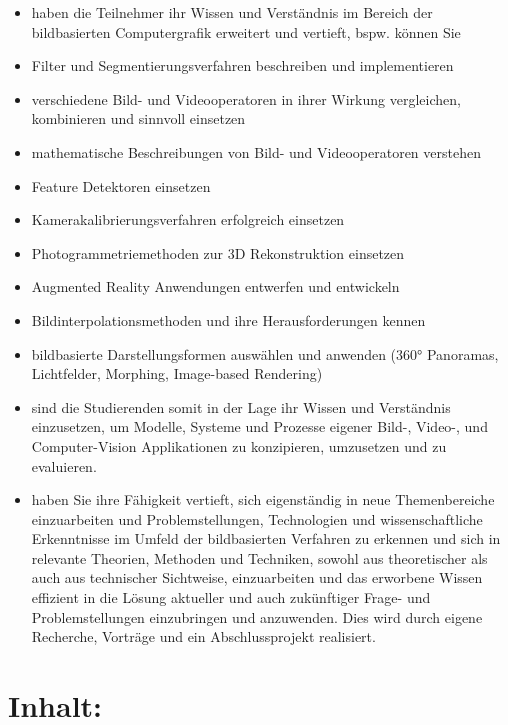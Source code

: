 \begin{itemize}
\tightlist
\item
  haben die Teilnehmer ihr Wissen und Verständnis im Bereich der
  bildbasierten Computergrafik erweitert und vertieft, bspw. können Sie
\item
  Filter und Segmentierungsverfahren beschreiben und implementieren
\item
  verschiedene Bild- und Videooperatoren in ihrer Wirkung vergleichen,
  kombinieren und sinnvoll einsetzen
\item
  mathematische Beschreibungen von Bild- und Videooperatoren verstehen
\item
  Feature Detektoren einsetzen
\item
  Kamerakalibrierungsverfahren erfolgreich einsetzen
\item
  Photogrammetriemethoden zur 3D Rekonstruktion einsetzen
\item
  Augmented Reality Anwendungen entwerfen und entwickeln
\item
  Bildinterpolationsmethoden und ihre Herausforderungen kennen
\item
  bildbasierte Darstellungsformen auswählen und anwenden (360°
  Panoramas, Lichtfelder, Morphing, Image-based Rendering)
\item
  sind die Studierenden somit in der Lage ihr Wissen und Verständnis
  einzusetzen, um Modelle, Systeme und Prozesse eigener Bild-, Video-,
  und Computer-Vision Applikationen zu konzipieren, umzusetzen und zu
  evaluieren.
\item
  haben Sie ihre Fähigkeit vertieft, sich eigenständig in neue
  Themenbereiche einzuarbeiten und Problemstellungen, Technologien und
  wissenschaftliche Erkenntnisse im Umfeld der bildbasierten Verfahren
  zu erkennen und sich in relevante Theorien, Methoden und Techniken,
  sowohl aus theoretischer als auch aus technischer Sichtweise,
  einzuarbeiten und das erworbene Wissen effizient in die Lösung
  aktueller und auch zukünftiger Frage- und Problemstellungen
  einzubringen und anzuwenden. Dies wird durch eigene Recherche,
  Vorträge und ein Abschlussprojekt realisiert.
\end{itemize}

\section*{Inhalt:\label{/mi-2017/modulbeschreibungen-master/MA_VC_Modul_BildbasierteComputergrafik}}\label{inhaltpathlabelmi-2017modulbeschreibungen-mastermaux5fvcux5fmodulux5fbildbasiertecomputergrafik}

